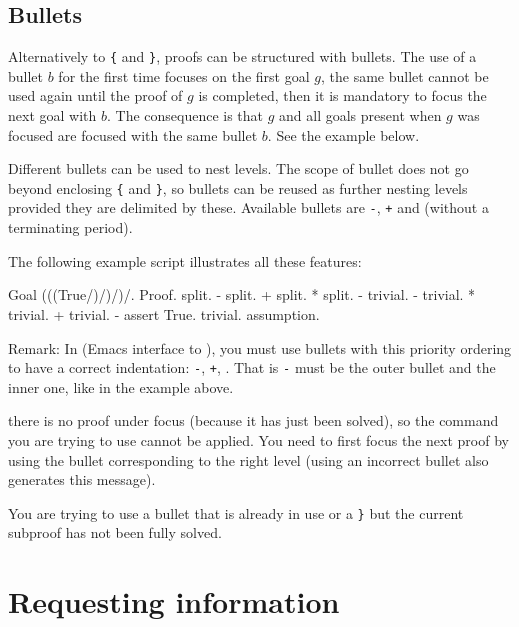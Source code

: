 \subsection[Bullets]{Bullets}
Alternatively to {\tt \{} and {\tt \}}, proofs can be structured with
bullets. The use of a bullet $b$ for the first time focuses on the
first goal $g$, the same bullet cannot be used again until the proof
of $g$ is completed, then it is mandatory to focus the next goal with $b$. The
consequence is that $g$ and all goals present when $g$ was focused are
focused with the same bullet $b$. See the example below.

Different bullets can be used to nest levels. The scope of bullet does
not go beyond enclosing {\tt \{} and {\tt \}}, so bullets can be
reused as further nesting levels provided they are delimited by these.
Available bullets are {\tt -}, {\tt +} and {\tt *} (without a
terminating period).

The following example script illustrates all these features:
\begin{coq_example*}
Goal (((True/\True)/\True)/\True)/\True.
Proof.
  split.
  - split.
    + split.
      * { split.
          - trivial.
          - trivial.
        }
      * trivial.
    + trivial.
  - assert True.
    { trivial. }
    assumption.
\end{coq_example*}

Remark: In {\ProofGeneral} (Emacs interface to {\Coq}), you must use bullets
with this priority ordering to have a correct indentation: {\tt -},
{\tt +}, {\tt *}. That is {\tt -} must be the outer bullet and {\tt *}
the inner one, like in the example above.

\begin{ErrMsgs}
\item {} there is no proof
      under focus (because it has just been solved), so the command
      you are trying to use cannot be applied. You need to first focus
      the next proof by using the bullet corresponding to the right
      level (using an incorrect bullet also generates this message).
\item {}
  You are trying to use a bullet that is already in use or a {\tt \}} but the current
  subproof has not been fully solved.
\end{ErrMsgs}


\section{Requesting information}

